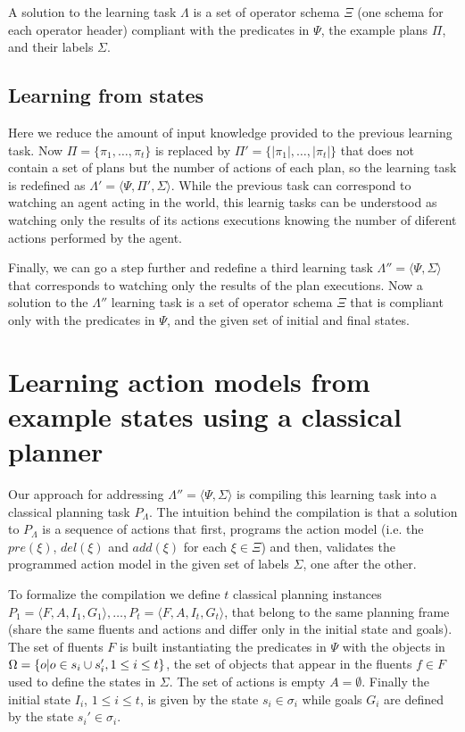 \documentclass[letterpaper]{article} %
\newcommand{\tup}[1]{{\langle #1 \rangle}}
\begin{document}
A solution to the learning task $\Lambda$ is a set of operator schema $\Xi$ (one schema for each operator header) compliant with the predicates in $\Psi$, the example plans $\Pi$, and their labels $\Sigma$.

\subsection{Learning from states}
Here we reduce the amount of input knowledge provided to the previous learning task. Now $\Pi=\{\pi_1,\ldots,\pi_t\}$ is replaced by  $\Pi'=\{|\pi_1|,\ldots,|\pi_t|\}$ that does not contain a set of plans but the number of actions of each plan, so the learning task is redefined as $\Lambda'=\tup{\Psi,\Pi',\Sigma}$. While the previous task can correspond to watching an agent acting in the world, this learnig tasks can be understood as watching only the results of its actions executions knowing the number of diferent actions performed by the agent.

Finally, we can go a step further and redefine a third learning task $\Lambda''=\tup{\Psi,\Sigma}$ that corresponds to watching only the results of the plan executions. Now a solution to the $\Lambda''$ learning task is a set of operator schema $\Xi$ that is compliant only with the predicates in $\Psi$, and the given set of initial and final states.


\section{Learning action models from example states using a classical planner}
Our approach for addressing $\Lambda''=\tup{\Psi,\Sigma}$ is compiling this learning task into a classical planning task $P_{\Lambda}$. The intuition behind the compilation is that a solution to $P_{\Lambda}$ is a sequence of actions that first, programs the action model (i.e. the $pre(\xi)$, $del(\xi)$ and $add(\xi)$ for each $\xi\in\Xi$) and then, validates the programmed action model in the given set of labels $\Sigma$, one after the other.

To formalize the compilation we define $t$ classical planning instances $P_1=\tup{F,A,I_1,G_1},\ldots,P_t=\tup{F,A,I_t,G_t}$, that belong to the same planning frame (share the same fluents and actions and differ only in the initial state and goals). The set of fluents $F$ is built instantiating the predicates in $\Psi$ with the objects in $\Omega=\{o|o\in s_i\cup s_i', {\small 1\leq i\leq t}\}$, the set of objects that appear in the fluents $f\in F$ used to define the states in $\Sigma$. The set of actions is empty $A=\emptyset$. Finally the initial state $I_i$, {\small $1\leq i\leq t$}, is given by the state $s_i\in \sigma_i$ while goals $G_i$ are defined by the state $s_i'\in \sigma_i$. 
\end{document}
